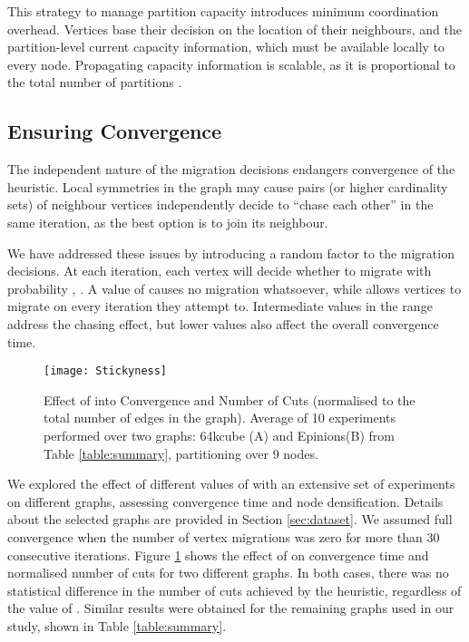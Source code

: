 \documentclass{sig-alternate-10pt}
\begin{document}
This strategy to manage partition capacity introduces minimum coordination overhead. Vertices base their decision on the location of their neighbours, and the partition-level current capacity information, which must be available locally to every node. Propagating capacity information is scalable, as it is proportional to the total number of partitions .


\subsection{Ensuring Convergence} 

The independent nature of the migration decisions endangers convergence of the heuristic. Local symmetries in the graph may cause pairs (or higher cardinality sets) of neighbour vertices independently decide to ``chase each other'' in the same iteration, as the best option is to join its neighbour. 

We have addressed these issues by introducing a random factor to the migration decisions. At each iteration, each vertex will decide whether to migrate with probability , . A value of  causes no migration whatsoever, while  allows vertices to migrate on every iteration they attempt to. Intermediate values in the range address the chasing effect, but lower values also affect the overall convergence time.

\begin{figure}
  \centering
    \texttt{[image: Stickyness]}
  \caption{Effect of  into Convergence and Number of Cuts (normalised to the total number of edges in the graph). Average of 10 experiments performed over two graphs: 64kcube (A) and Epinions(B) from Table \ref{table:summary}, partitioning over 9 nodes.}
    \vspace{-10pt}
  \label{fig:convergence}
\end{figure}

We explored the effect of different values of  with an extensive set of experiments on different graphs, assessing convergence time and node densification. Details about the selected graphs are provided in Section \ref{sec:dataset}. We assumed full convergence when the number of vertex migrations was zero for more than 30 consecutive iterations. Figure \ref{fig:convergence} shows the effect of  on convergence time and normalised number of cuts for two different graphs. In both cases, there was no statistical difference in the number of cuts achieved by the heuristic, regardless of the value of . Similar results were obtained for the remaining graphs used in our study, shown in Table \ref{table:summary}.
\end{document}
